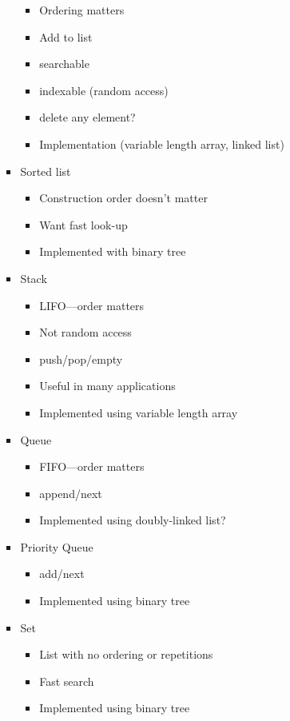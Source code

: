 \documentclass{article}
\begin{document}
\begin{enumerate}
\begin{itemize}
\begin{itemize}
\begin{itemize}
      \item Ordering matters
      \item Add to list
      \item searchable
      \item indexable (random access)
      \item delete any element?
      \item Implementation (variable length array, linked list)
      \end{itemize}
    \item Sorted list
      \begin{itemize}
      \item Construction order doesn't matter
      \item Want fast look-up
      \item Implemented with binary tree
      \end{itemize}
    \item Stack
      \begin{itemize}
      \item LIFO---order matters
      \item Not random access
      \item push/pop/empty
      \item Useful in many applications
      \item Implemented using variable length array
      \end{itemize}
    \item Queue
      \begin{itemize}
      \item FIFO---order matters
      \item append/next
      \item Implemented using doubly-linked list?
      \end{itemize}
    \item Priority Queue
      \begin{itemize}
      \item add/next
      \item Implemented using binary tree
      \end{itemize}
    \item Set
      \begin{itemize}
      \item List with no ordering or repetitions
      \item Fast search
      \item Implemented using binary tree
      \end{itemize}

\end{itemize}
\end{itemize}
\end{enumerate}
\end{document}
